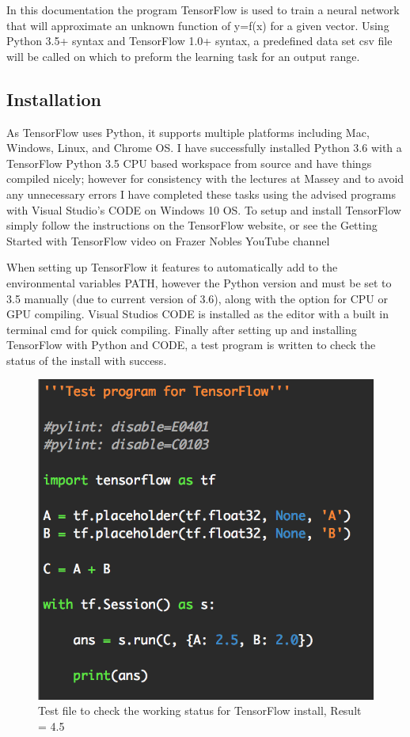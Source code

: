 \documentclass[a4paper, 10pt]{IEEEconf}
\begin{document}
In this documentation the program TensorFlow is used to train a neural network that will approximate an unknown function of y=f(x) for a given vector. Using Python 3.5+ syntax and TensorFlow 1.0+ syntax, a predefined data set csv file will be called on which to preform the learning task for an output range.



\subsection{Installation}

As TensorFlow uses Python, it supports multiple platforms including Mac, Windows, Linux, and Chrome OS. I have successfully installed Python 3.6 with a TensorFlow Python 3.5 CPU based workspace from source and have things compiled nicely; however for consistency with the lectures at Massey and to avoid any unnecessary errors I have completed these tasks using the advised programs with Visual Studio's CODE on Windows 10 OS\cite{CODE}. To setup and install TensorFlow simply follow the instructions on the TensorFlow website, or see the Getting Started with TensorFlow video on Frazer Nobles YouTube channel \cite{tfinstall}

When setting up TensorFlow it features to automatically add to the environmental variables PATH, however the Python version and must be set to 3.5 manually (due to current version of 3.6), along with the option for CPU or GPU compiling. Visual Studios CODE is installed as the editor with a built in terminal cmd for quick compiling. Finally after setting up and installing TensorFlow with Python and CODE, a test program is written to check the status of the install with success\cite{GS}.

\begin{figure}[H]
  \includegraphics[width=0.5\linewidth, center]{images/test}
  \caption{Test file to check the working status for TensorFlow install, Result = 4.5}
  \label{fig:Test file to check the working status for TensorFlow install, Result = 4.5}
\end{figure}
\end{document}
